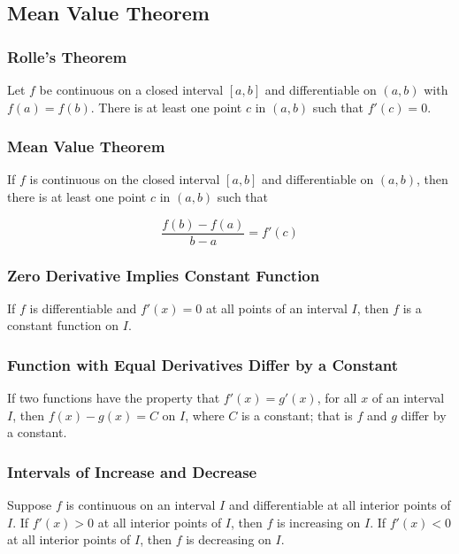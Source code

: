 %
%
%

\subsection{Mean Value Theorem}
\subsubsection{Rolle's Theorem}
Let $f$ be continuous on a closed interval $[a, b]$ and differentiable on $(a, b)$ with $f(a) = f(b)$. There is at least one point $c$ in $(a, b)$ such that $f'(c) = 0$.

\subsubsection{Mean Value Theorem}
If $f$ is continuous on the closed interval $[a, b]$ and differentiable on $(a, b)$, then there is at least one point $c$ in $(a, b)$ such that

\begin{equation}
    \frac{f(b) - f(a)}{b - a} = f'(c)
\end{equation}

\subsubsection{Zero Derivative Implies Constant Function}
If $f$ is differentiable and $f'(x) = 0$ at all points of an interval $I$, then $f$ is a constant function on $I$.

\subsubsection{Function with Equal Derivatives Differ by a Constant}
If two functions have the property that $f'(x) = g'(x)$, for all $x$ of an interval $I$, then $f(x) - g(x) = C$ on $I$, where $C$ is a constant; that is $f$ and $g$ differ by a constant.

\subsubsection{Intervals of Increase and Decrease}
Suppose $f$ is continuous on an interval $I$ and differentiable at all interior points of $I$. If $f'(x) > 0$ at all interior points of $I$, then $f$ is increasing on $I$. If $f'(x) < 0$ at all interior points of $I$, then $f$ is decreasing on $I$.
